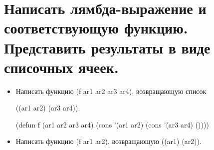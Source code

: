 \section{Написать лямбда-выражение и соответствующую функцию. Представить результаты в виде списочных ячеек.}
\begin{itemize}
	\item Написать функцию (f ar1 ar2 ar3 ar4), возвращающую список 
	
	((ar1 ar2) (ar3 ar4)).
	
	(defun f (ar1 ar2 ar3 ar4) (cons '(ar1 ar2) (cons '(ar3 ar4) ())))
	
	\begin{figure}[H]
	\end{figure} 
	
	\item Написать функцию (f ar1 ar2), возвращающую ((ar1) (ar2)).
	

\end{itemize}
